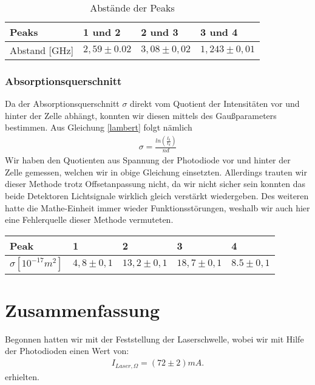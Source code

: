 \documentclass[12pt]{article}
\begin{document}
\begin{table}[H]
\begin{center}
\begin{tabular}{|l|l|l|l|}
\hline
Peaks & 1 und 2 & 2 und 3 & 3 und 4\\
\hline
Abstand [GHz] & $2,59 \pm 0.02$ & $3,08 \pm 0,02$ & $1,243 \pm 0,01$\\
\hline
\end{tabular}
\end{center}
\caption{Abstände der Peaks}
\label{dist}
\end{table}


\subsubsection{Absorptionsquerschnitt}
Da der Absorptionsquerschnitt $\sigma$ direkt vom Quotient der Intensitäten vor und hinter der Zelle abhängt, konnten wir diesen mittels des Gaußparameters bestimmen. Aus Gleichung \ref{lambert} folgt nämlich
\begin{align*}
 \sigma = \frac{ln \left( \frac{I_0}{I_d} \right) }{nd} 
\end{align*}
Wir haben den Quotienten aus Spannung der Photodiode vor und hinter der Zelle gemessen, welchen wir in obige Gleichung einsetzten. Allerdings trauten wir dieser Methode trotz Offsetanpassung nicht, da wir nicht sicher sein konnten das beide Detektoren Lichtsignale wirklich gleich verstärkt wiedergeben. Des weiteren hatte die Mathe-Einheit immer wieder Funktionsstörungen, weshalb wir auch hier eine Fehlerquelle dieser Methode vermuteten.
\begin{center}
\begin{tabular}{|l|l|l|l|l|}
\hline 
Peak & 1 & 2 & 3 & 4\\
\hline
$\sigma [10^{-17} m^2]$ & $4,8 \pm 0,1$ & $13,2 \pm 0,1$ & $18,7 \pm 0,1$ & $8.5 \pm 0,1$\\
\hline
\end{tabular}
\end{center}
\section{Zusammenfassung}
Begonnen hatten wir mit der Feststellung der Laserschwelle, wobei wir mit Hilfe der Photodioden einen Wert von:
\begin{align*}
 I_{Laser, \Omega} = (72 \pm 2) mA. 
\end{align*}
erhielten.\\
\end{document}

